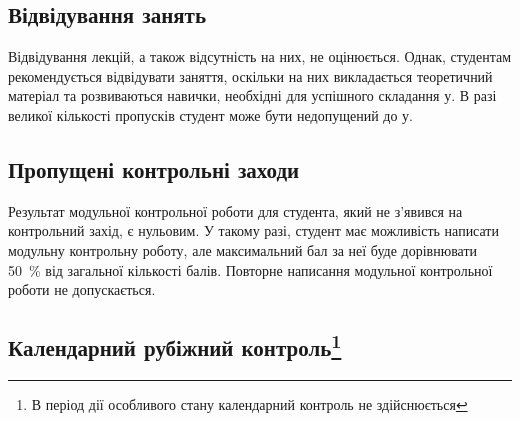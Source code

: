 \documentclass{Syllabus}
\begin{document}

\subsection*{Відвідування занять}
Відвідування лекцій, а також відсутність на них, не оцінюється. Однак, студентам рекомендується відвідувати заняття, оскільки на них викладається теоретичний матеріал та розвиваються навички, необхідні для успішного складання \control у. В разі великої кількості пропусків студент може бути недопущений до \control у.

\subsection*{Пропущені контрольні заходи}

Результат модульної контрольної роботи для студента, який не з’явився на контрольний захід, є нульовим. У такому разі, студент має можливість написати модульну контрольну роботу, але максимальний бал за неї буде дорівнювати 50~\% від загальної кількості балів. Повторне написання модульної контрольної роботи не допускається.

\subsection*{Календарний рубіжний контроль\footnote{В період дії особливого стану календарний контроль не здійснюється}}
\end{document}
